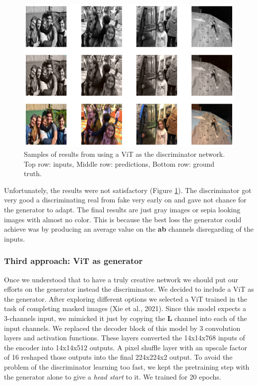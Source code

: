 \documentclass[
]{article}
\begin{document}
\begin{figure}
\centering
\includegraphics{results/ViTasDiscriminator.png}
\caption{Samples of results from using a ViT as the discriminator
network. Top row: inputs, Middle row: predictions, Bottom row: ground
truth.}
\label{fig:ViT-discriminator-results}
\end{figure}

Unfortunately, the results were not satisfactory (Figure \ref{fig:ViT-discriminator-results}). The discriminator got
very good a discriminating real from fake very early on and gave not
chance for the generator to adapt. The final results are just gray
images or sepia looking images with almost no color. This is because the
best loss the generator could achieve was by producing an average value
on the \textbf{ab} channels disregarding of the inputs.

\hypertarget{third-approach-vit-as-generator}{%
\subsubsection{Third approach: ViT as
generator}\label{third-approach-vit-as-generator}}

Once we understood that to have a truly creative network we should put
our efforts on the generator instead the discriminator. We decided to
include a ViT as the generator. After exploring different options we
selected a ViT trained in the task of completing masked images (Xie et
al., 2021). Since this model expects a 3-channels input, we mimicked it
just by copying the \textbf{L} channel into each of the input channels.
We replaced the decoder block of this model by 3 convolution layers and
activation functions. These layers converted the 14x14x768 inputs of the
encoder into 14x14x512 outputs. A pixel shuffle layer with an upscale
factor of 16 reshaped those outputs into the final 224x224x2 output. To
avoid the problem of the discriminator learning too fast, we kept the
pretraining step with the generator alone to give a \emph{head start} to
it. We trained for 20 epochs.
\end{document}

